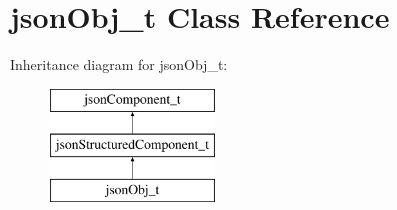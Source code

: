 \hypertarget{classjsonObj__t}{\section{json\-Obj\-\_\-t \-Class \-Reference}
\label{classjsonObj__t}
}
\-Inheritance diagram for json\-Obj\-\_\-t\-:\begin{figure}[H]
\begin{center}
\leavevmode
\includegraphics[height=3.000000cm]{classjsonObj__t}
\end{center}
\end{figure}

